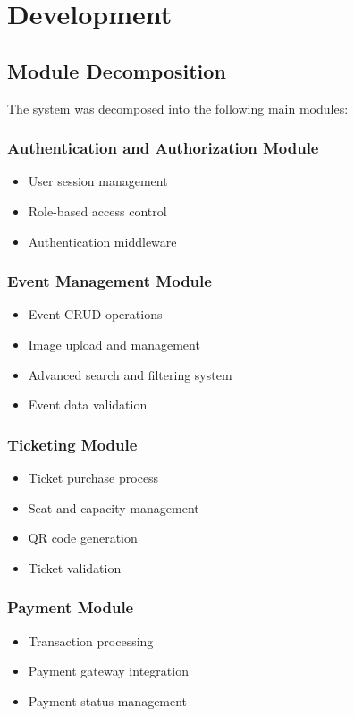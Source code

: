 \documentclass[12pt,a4paper]{article}
\begin{document}
\section{Development}

\subsection{Module Decomposition}

The system was decomposed into the following main modules:

\subsubsection{Authentication and Authorization Module}
\begin{itemize}
    \item User session management
    \item Role-based access control
    \item Authentication middleware
\end{itemize}

\subsubsection{Event Management Module}
\begin{itemize}
    \item Event CRUD operations
    \item Image upload and management
    \item Advanced search and filtering system
    \item Event data validation
\end{itemize}

\subsubsection{Ticketing Module}
\begin{itemize}
    \item Ticket purchase process
    \item Seat and capacity management
    \item QR code generation
    \item Ticket validation
\end{itemize}

\subsubsection{Payment Module}
\begin{itemize}
    \item Transaction processing
    \item Payment gateway integration
    \item Payment status management
\end{itemize}
\end{document}
